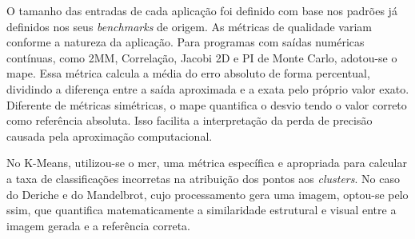 O tamanho das entradas de cada aplicação foi definido com base nos padrões já definidos nos seus \textit{benchmarks} de origem. As métricas de qualidade variam conforme a natureza da aplicação. Para programas com saídas numéricas contínuas, como 2MM, Correlação, Jacobi 2D e PI de Monte Carlo, adotou-se o \gls{mape}. Essa métrica calcula a média do erro absoluto de forma percentual, dividindo a diferença entre a saída aproximada e a exata pelo próprio valor exato. Diferente de métricas simétricas, o \gls{mape} quantifica o desvio tendo o valor correto como referência absoluta. Isso facilita a interpretação da perda de precisão causada pela aproximação computacional.

No K-Means, utilizou-se o \gls{mcr}, uma métrica específica e apropriada para calcular a taxa de classificações incorretas na atribuição dos pontos aos \textit{clusters}. No caso do Deriche e do Mandelbrot, cujo processamento gera uma imagem, optou-se pelo \gls{ssim}, que quantifica matematicamente a similaridade estrutural e visual entre a imagem gerada e a referência correta.
